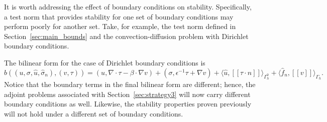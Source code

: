 \documentclass[11pt,onecolumn]{scrartcl}
\newcommand{\LRs}[1]{\left[ #1 \right]}
\newcommand{\jump}[1] {\ensuremath{\LRs{\![#1]\!}}}
\newcommand{\Gh}{\Gamma_h}
\newcommand{\grad}{\nabla}
\renewcommand{\div}{\grad \cdot}
\begin{document}
It is worth addressing the effect of boundary conditions on stability.  Specifically, a test norm that provides stability for one set of boundary conditions may perform poorly for another set.  Take, for example, the test norm defined in Section~\ref{sec:main_bounds} and the convection-diffusion problem with Dirichlet boundary conditions. 

The bilinear form for the case of Dirichlet boundary conditions is 
\[
b\left(\left(u,\sigma, \widehat{u}, \widehat{\sigma}_n\right), \left(v,\tau\right)\right) = \left(u,\div \tau - \beta \cdot \grad v\right) + \left(\sigma, \epsilon^{-1} \tau + \grad v\right) + \langle \widehat{u}, \jump{\tau \cdot n} \rangle_{\Gh^0} + \langle \widehat{f}_n, \jump{v} \rangle_{\Gh}.
\]
Notice that the boundary terms in the final bilinear form are different; hence, the adjoint problems associated with Section~\ref{sec:strategy3} will now carry different boundary conditions as well. Likewise, the stability properties proven previously will not hold under a different set of boundary conditions.  
\end{document}
